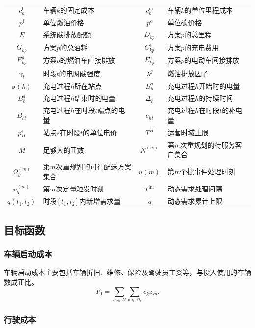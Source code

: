 \documentclass{setp-new}
\begin{document}
\begin{table}[H]
\begin{tabularx}{\linewidth}{@{}c>{\RaggedRight\arraybackslash}Xc>{\RaggedRight\arraybackslash}X@{}}
$c_k^{\mathrm f}$ & 车辆$k$的固定成本 & $c_k^{\mathrm m}$ & 车辆$k$的单位里程成本\\
$p^{\mathrm f}$ & 单位燃油价格 & $p^{\mathrm c}$ & 单位碳价格\\
$\overline E$ & 系统碳排放配额 & $D_{kp}$ & 方案$p$的总里程\\
$G_{kp}$ & 方案$p$的总油耗 & $C_{kp}^{\mathrm e}$ & 方案$p$的充电费用\\
$E_{kp}^{g}$ & 方案$p$的燃油车直接排放 & $E_{kp}^{e}$ & 方案$p$的电动车间接排放\\
$\gamma_t$ & 时段$t$的电网碳强度 & $\lambda^{g}$ & 燃油排放因子\\
$\sigma(h)$ & 充电过程$h$所在站点 & $B_h^{a}$ & 充电过程$h$开始时的电量\\
$B_h^{d}$ & 充电过程$h$结束时的电量 & $\Delta_h$ & 充电过程$h$的持续时间\\
$B_{ht}$ & 充电过程$h$在时段$t$端点的电量 & $e_{ht}$ & 充电过程$h$在时段$t$的补电量\\
$p_{st}^{\mathrm e}$ & 站点$s$在时段$t$的单位电价 & $T^{H}$ & 运营时域上限\\
$M$ & 足够大的正数 & $N^{(m)}$ & 第$m$次重规划的待服务客户集合\\
$\Omega_k^{(m)}$ & 第$m$次重规划的可行配送方案集合 & $u(m)$ & 第$m$个批事件处理时刻\\
$u_q^{(m)}$ & 第$m$次定量触发时刻 & $T^{\mathrm{int}}$ & 动态需求处理间隔\\
$q(t_1,t_2)$ & 时段$[t_1,t_2]$内新增需求量 & $\bar q$ & 动态需求累计上限\\
\bottomrule
\end{tabularx}
\end{table}

\subsection{目标函数}

\subsubsection{车辆启动成本}

车辆启动成本主要包括车辆折旧、维修、保险及驾驶员工资等，与投入使用的车辆数成正比。
\begin{equation}
F_1=\sum_{k\in K}\sum_{p\in\Omega_k}c_k^{\mathrm f}z_{kp}.
\label{eq:unified-f1}
\end{equation}

\subsubsection{行驶成本}
\end{document}
